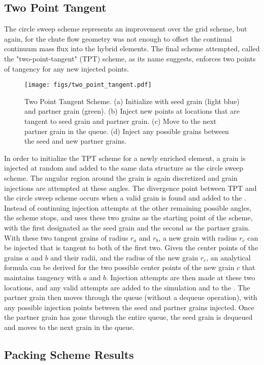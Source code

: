 \subsection{Two Point Tangent}
The circle sweep scheme represents an improvement over the grid scheme, but again, for the chute flow geometry was not enough to offset the continual continuum mass flux into the hybrid elements. The final scheme attempted, called the "two-point-tangent" (TPT) scheme, as its name suggests, enforces two points of tangency for any new injected points. 

\begin{figure}[htp] 
    \centering
    \texttt{[image: figs/two\_point\_tangent.pdf]}
    \caption{Two Point Tangent Scheme. (a) Initialize with seed grain (light blue) and  partner grain (green). (b) Inject new points at locations that are tangent to seed grain and partner grain. (c) Move to the next partner grain in the queue. (d) Inject any possible grains between the seed and new partner grains.}
    \label{two_tangent_enrichment}
\end{figure}

In order to initialize the TPT scheme for a newly enriched element, a grain is injected at random and added to the same \seed data structure as the circle sweep scheme. The angular region around the grain is again discretized and grain injections are attempted at these angles. The divergence point between TPT and the circle sweep scheme occurs when a valid grain is found and added to the \seed. Instead of continuing injection attempts at the other remaining possible angles, the scheme stops, and uses these two grains as the starting point of the scheme, with the first designated as the seed grain and the second as the partner grain. With these two tangent grains of radius $r_a$ and $r_b$, a new grain with radius $r_c$ can be injected that is tangent to both of the first two. Given the center points of the grains $a$ and $b$ and their radii, and the radius of the new grain $r_c$, an analytical formula can be derived for the two possible center points of the new grain $c$ that maintains tangency with $a$ and $b$. Injection attempts are then made at these two locations, and any valid attempts are added to the simulation and to the \seed. The partner grain then moves through the queue (without a dequeue operation), with any possible injection points between the seed and partner grains injected. Once the partner grain has gone through the entire queue, the seed grain is dequeued and moves to the next grain in the queue.


\subsection{Packing Scheme Results}



